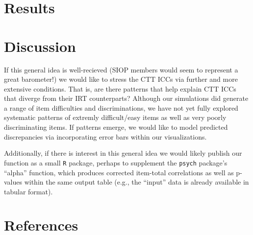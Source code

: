 \documentclass[
  english,
  man]{apa6}
\begin{document}
\hypertarget{results-2}{%
\section{Results}\label{results-2}}

\hypertarget{discussion}{%
\section{Discussion}\label{discussion}}

If this general idea is well-recieved (SIOP members would seem to represent a great barometer!) we would like to stress the CTT ICCs via further and more extensive conditions. That is, are there patterns that help explain CTT ICCs that diverge from their IRT counterparts? Although our simulations did generate a range of item difficulties and discriminations, we have not yet fully explored systematic patterns of extremly difficult/easy items as well as very poorly discriminating items. If patterns emerge, we would like to model predicted discrepancies via incorporating error bars within our visualizations.

Additionally, if there is interest in this general idea we would likely publish our function as a small \texttt{R} package, perhaps to supplement the \texttt{psych} package's ``alpha'' function, which produces corrected item-total correlations as well as p-values within the same output table (e.g., the ``input'' data is already available in tabular format).

\newpage

\hypertarget{references}{%
\section{References}\label{references}}

\begingroup
\setlength{\parindent}{-0.5in}
\setlength{\leftskip}{0.5in}
\end{document}
